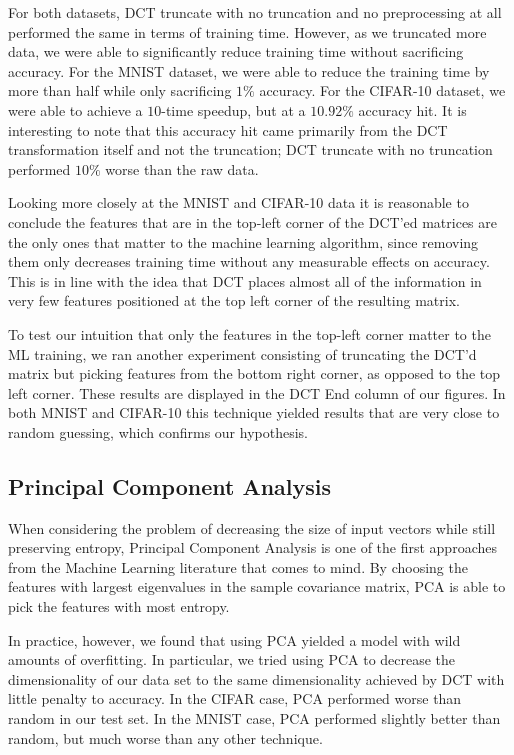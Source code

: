 \documentclass[12pt]{article}
\begin{document}
For both datasets, DCT truncate with no truncation and no preprocessing at all performed the same in terms of training time.  However, as we truncated more data, we were able to significantly reduce training time without sacrificing accuracy.  For the MNIST dataset, we were able to reduce the training time by more than half while only sacrificing $1\%$ accuracy.  For the CIFAR-10 dataset, we were able to achieve a $10$-time speedup, but at a $10.92\%$ accuracy hit.  It is interesting to note that this accuracy hit came primarily from the DCT transformation itself and not the truncation; DCT truncate with no truncation performed $10\%$ worse than the raw data.

Looking more closely at the MNIST and CIFAR-10 data it is reasonable to conclude the features that are in the top-left corner of the DCT'ed matrices are the only ones that matter to the machine learning algorithm, since removing them only decreases training time without any measurable effects on accuracy. This is in line with the idea that DCT places almost all of the information in very few features positioned at the top left corner of the resulting matrix.

To test our intuition that only the features in the top-left corner  matter to the ML training, we ran another experiment consisting of truncating the DCT'd matrix but picking features from the bottom right corner, as opposed to the top left corner. These results are displayed in the DCT End column of our figures.  In both MNIST and CIFAR-10 this technique yielded results that are very close to random guessing, which confirms our hypothesis.

\subsection{Principal Component Analysis}

When considering the problem of decreasing the size of input vectors while still preserving entropy, Principal Component Analysis \cite{jolliffe} is one of the first approaches from the Machine Learning literature that comes to mind. By choosing the features with largest eigenvalues in the sample covariance matrix, PCA is able to pick the features with most entropy.

In practice, however, we found that using PCA yielded a model with wild amounts of overfitting. In particular, we tried using PCA to decrease the dimensionality of our data set to the same dimensionality achieved by DCT with little penalty to accuracy. In the CIFAR case, PCA performed worse than random in our test set. In the MNIST case, PCA performed slightly better than random, but much worse than any other technique.
\end{document}
